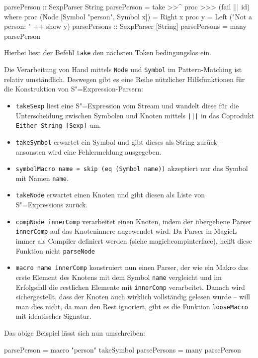\documentclass[12pt, a4paper, bibgerm]{scrbook}
\newenvironment{DIFnomarkup}{}{}
\newcommand\icode[1]{\lstinline?#1?}
\newcommand\sref{}
\newcommand{\sexp}{S"=Expression}
\newcommand{\sexps}{S"=Expressions}
\begin{document}
\begin{DIFnomarkup}\begin{code}
parsePerson :: SexpParser String
parsePerson = take >>^ proc >>> (fail ||| id)
  where proc (Node [Symbol "person", Symbol x]) = Right x
        proc y = Left ("Not a person: " ++ show y)
parsePersons :: SexpParser [String]
parsePersons = many parsePerson
\end{code}\end{DIFnomarkup} %
Hierbei liest der Befehl \icode{take} den nächsten Token bedingungslos
ein.

Die Verarbeitung von Hand mittels \icode{Node} und \icode{Symbol} im
Pattern-Matching ist relativ umständlich. Deswegen gibt es eine Reihe
nützlicher Hilfsfunktionen für die Konstruktion von \sexp{}-Parsern:

\begin{itemize}
\item \icode{takeSexp} liest eine \sexp{} vom Stream und wandelt diese
  für die Unterscheidung zwischen Symbolen und Knoten mittels
  \icode{|||} in das Coprodukt \icode{Either String [Sexp]} um.
\item \icode{takeSymbol} erwartet ein Symbol und gibt dieses als String
  zurück -- ansonsten wird eine Fehlermeldung ausgegeben.
\item \icode{symbolMacro name = skip (eq (Symbol name))} akzeptiert nur
  das Symbol mit Namen \icode{name}.
\item \icode{takeNode} erwartet einen Knoten und gibt diesen als Liste
  von \sexps{} zurück.
\item \icode{compNode innerComp} verarbeitet einen Knoten, indem der
  übergebene Parser \icode{innerComp} auf das Knoteninnere angewendet
  wird. Da Parser in MagicL immer als Compiler definiert werden (siehe
  \sref{magicl:compinterface}), heißt diese Funktion nicht
  \icode{parseNode}
\item \icode{macro name innerComp} %
  konstruiert nun einen Parser, der wie ein Makro das erste Element des
  Knotens mit dem Symbol \icode{name} vergleicht und im Erfolgsfall die
  restlichen Elemente mit \icode{innerComp} verarbeitet. Danach wird
  sichergestellt, dass der Knoten auch wirklich vollständig gelesen
  wurde -- will man dies nicht, da man den Rest ignoriert, gibt es die
  Funktion \icode{looseMacro} mit identischer Signatur.
\end{itemize}
Das obige Beispiel lässt sich nun umschreiben:
\begin{DIFnomarkup}\begin{code}
parsePerson  = macro "person" takeSymbol
parsePersons = many parsePerson
\end{code}\end{DIFnomarkup}
\end{document}
